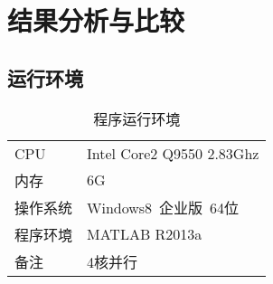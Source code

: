 

\chapter{结果分析与比较}

\section{运行环境}
\begin{table}[htbp]
  \centering
  \caption{程序运行环境}
  \label{tab:sysenr}
    \begin{tabular}{p{6em}|l}
      \toprule[1.5pt]
      CPU & Intel Core2 Q9550 2.83Ghz\\
      内存 & 6G\\
      操作系统 & Windows8\ 企业版\ 64位\\
      程序环境 & MATLAB R2013a\\
      备注 & 4核并行\\
      \bottomrule[1.5pt]
    \end{tabular}
\end{table}
